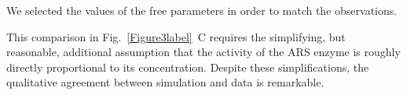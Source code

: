 \documentclass[oneside, 10pt, a4paper, twocolumn]{article}
\begin{document}

We selected the values of the free parameters in order to match the observations. 

This comparison in Fig.~\ref{Figure3label}~C requires the simplifying, but  reasonable, additional assumption that the activity of the ARS enzyme is roughly directly proportional to its concentration. 
Despite these simplifications, the qualitative agreement between simulation and data is remarkable. 
\end{document}
